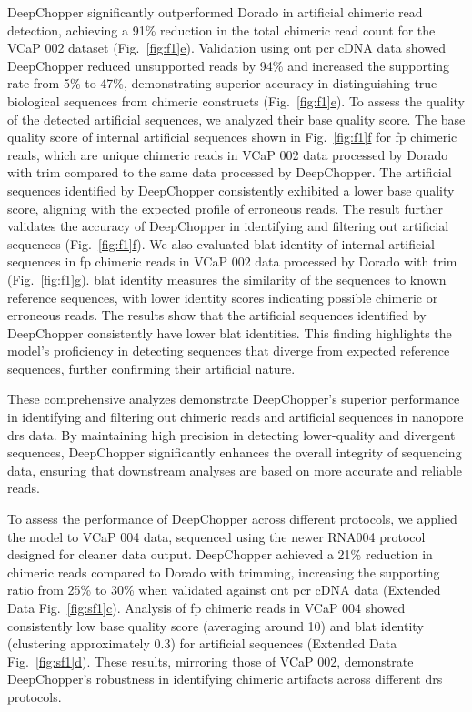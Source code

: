 \documentclass[pdflatex, sn-mathphys-num, lineno]{sn-jnl}%
\newcommand{\figref}[2]{Fig.~\hyperref[#1]{\ref*{#1}#2}}
\newcommand{\edfigref}[2]{Extended Data Fig.~\hyperref[#1]{\ref*{#1}#2}}
\theoremstyle{thmstyleone}%
\theoremstyle{thmstyletwo}%
\theoremstyle{thmstylethree}%
\begin{document}
DeepChopper significantly outperformed Dorado in artificial chimeric read detection, achieving a 91\% reduction in the total chimeric read count for the VCaP 002 dataset (\figref{fig:f1}{e}).
Validation using \gls{ont} \gls{pcr} cDNA data showed DeepChopper reduced unsupported reads by 94\% and increased the supporting rate from 5\% to 47\%, demonstrating superior accuracy in distinguishing true biological sequences from chimeric constructs (\figref{fig:f1}{e}).
To assess the quality of the detected artificial sequences, we analyzed their base quality score.
The base quality score of internal artificial sequences shown in \figref{fig:f1}{f}  for \gls{fp} chimeric reads, which are unique chimeric reads in VCaP 002 data processed by Dorado with trim compared to the same data processed by DeepChopper.
The artificial sequences identified by DeepChopper consistently exhibited a lower base quality score, aligning with the expected profile of erroneous reads.
The result further validates the accuracy of DeepChopper in identifying and filtering out artificial sequences (\figref{fig:f1}{f}).
We also evaluated \gls{blat} identity of internal artificial sequences in \gls{fp} chimeric reads in VCaP 002 data processed by Dorado with trim  (\figref{fig:f1}{g}).
\gls{blat} identity measures the similarity of the sequences to known reference sequences, with lower identity scores indicating possible chimeric or erroneous reads.
The results show that the artificial sequences identified by DeepChopper consistently have lower \gls{blat} identities.
This finding highlights the model's proficiency in detecting sequences that diverge from expected reference sequences, further confirming their artificial nature.

These comprehensive analyzes demonstrate DeepChopper's superior performance in identifying and filtering out chimeric reads and artificial sequences in nanopore \gls{drs} data.
By maintaining high precision in detecting lower-quality and divergent sequences, DeepChopper significantly enhances the overall integrity of sequencing data, ensuring that downstream analyses are based on more accurate and reliable reads.

To assess the performance of DeepChopper across different protocols, we applied the model to VCaP 004 data, sequenced using the newer RNA004 protocol designed for cleaner data output.
DeepChopper achieved a 21\% reduction in chimeric reads compared to Dorado with trimming, increasing the supporting ratio from 25\%  to 30\% when validated against \gls{ont} \gls{pcr} cDNA data (\edfigref{fig:sf1}{c}).
Analysis of \gls{fp} chimeric reads in VCaP 004 showed consistently low base quality score (averaging around 10) and \gls{blat} identity (clustering approximately 0.3) for artificial sequences (\edfigref{fig:sf1}{d}).
These results, mirroring those of VCaP 002, demonstrate DeepChopper's robustness in identifying chimeric artifacts across different \gls{drs} protocols.
\end{document}
